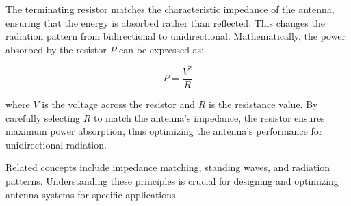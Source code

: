 The terminating resistor matches the characteristic impedance of the antenna, ensuring that the energy is absorbed rather than reflected. This changes the radiation pattern from bidirectional to unidirectional. Mathematically, the power absorbed by the resistor \( P \) can be expressed as:

\[
P = \frac{V^2}{R}
\]

where \( V \) is the voltage across the resistor and \( R \) is the resistance value. By carefully selecting \( R \) to match the antenna's impedance, the resistor ensures maximum power absorption, thus optimizing the antenna's performance for unidirectional radiation.

Related concepts include impedance matching, standing waves, and radiation patterns. Understanding these principles is crucial for designing and optimizing antenna systems for specific applications.

